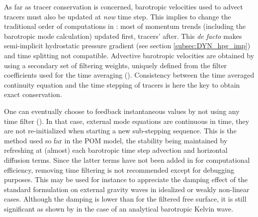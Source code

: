 \documentclass[../main/NEMO_manual]{subfiles}
\begin{document}

As far as tracer conservation is concerned,
barotropic velocities used to advect tracers must also be updated at \textit{now} time step.
This implies to change the traditional order of computations in \NEMO:
most of momentum trends (including the barotropic mode calculation) updated first, tracers' after.
This \textit{de facto} makes semi-implicit hydrostatic pressure gradient
(see section \autoref{subsec:DYN_hpg_imp})
and time splitting not compatible.
Advective barotropic velocities are obtained by using a secondary set of filtering weights,
uniquely defined from the filter coefficients used for the time averaging (\citet{Shchepetkin_McWilliams_OM05}).
Consistency between the time averaged continuity equation and the time stepping of tracers is here the key to
obtain exact conservation.


One can eventually choose to feedback instantaneous values by not using any time filter
(). 
In that case, external mode equations are continuous in time,
\ie they are not re-initialized when starting a new sub-stepping sequence.
This is the method used so far in the POM model, the stability being maintained by
refreshing at (almost) each barotropic time step advection and horizontal diffusion terms.
Since the latter terms have not been added in \NEMO for computational efficiency,
removing time filtering is not recommended except for debugging purposes.
This may be used for instance to appreciate the damping effect of the standard formulation on
external gravity waves in idealized or weakly non-linear cases.
Although the damping is lower than for the filtered free surface,
it is still significant as shown by \citet{Levier2007} in the case of an analytical barotropic Kelvin wave.
\end{document}
